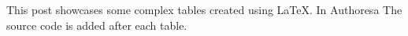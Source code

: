 This post showcases some complex tables created using LaTeX. In Authoresa The source code is added after each table.

\newline